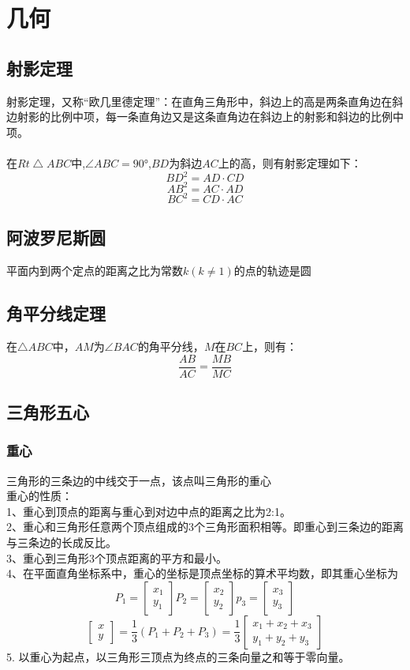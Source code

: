 \documentclass[UTF8]{ctexart}
\begin{document}
	\section{几何}
		\subsection{射影定理}
			射影定理，又称“欧几里德定理”：在直角三角形中，斜边上的高是两条直角边在斜边射影的比例中项，每一条直角边又是这条直角边在斜边上的射影和斜边的比例中项。\\
			\\
			在$Rt\bigtriangleup  ABC$中,$\angle ABC=\ang{90}$,$BD$为斜边$AC$上的高，则有射影定理如下：
			\[BD^2=AD\cdot CD\]
			\[AB^2=AC\cdot AD\]
			\[BC^2=CD\cdot AC\]
		\subsection{阿波罗尼斯圆}
			平面内到两个定点的距离之比为常数$k(k\neq1)$的点的轨迹是圆
		\subsection{角平分线定理}
			在$\bigtriangleup ABC$中，$AM$为$\angle BAC$的角平分线，$M$在$BC$上，则有：
			\[\frac{AB}{AC}=\frac{MB}{MC}\]
		\subsection{三角形五心}
			\subsubsection{重心}
				三角形的三条边的中线交于一点，该点叫三角形的重心\\
				重心的性质：\\
				1、重心到顶点的距离与重心到对边中点的距离之比为2:1。\\
				2、重心和三角形任意两个顶点组成的3个三角形面积相等。即重心到三条边的距离与三条边的长成反比。\\
				3、重心到三角形3个顶点距离的平方和最小。\\
				4、在平面直角坐标系中，重心的坐标是顶点坐标的算术平均数，即其重心坐标为
				\[P_1=
					\begin{bmatrix}
						x_1\\
						y_1
					\end{bmatrix}
				  P_2=
					\begin{bmatrix}
						x_2\\
						y_2
					\end{bmatrix}
				  p_3=
					\begin{bmatrix}
						x_3\\
						y_3
					\end{bmatrix}
				\]
				\[
					\begin{bmatrix}
						x\\
						y
					\end{bmatrix}
					=\frac{1}{3}(P_1+P_2+P_3)=\frac{1}{3}
					\begin{bmatrix}
						x_1+x_2+x_3\\
						y_1+y_2+y_3
					\end{bmatrix}
				\]
				5. 以重心为起点，以三角形三顶点为终点的三条向量之和等于零向量。
\end{document}
